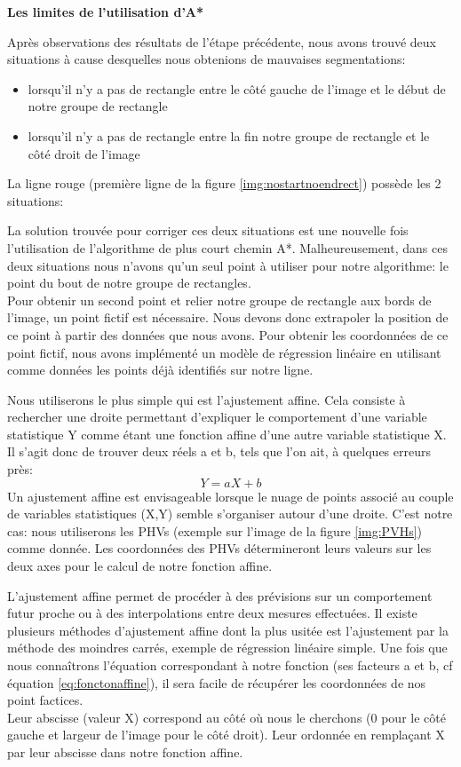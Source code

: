 \documentclass[12pt,a4paper]{article}
\begin{document}
\newpage
\bigbreak\textbf{Les limites de l'utilisation d'A*}\bigbreak

Après observations des résultats de l'étape précédente, nous avons trouvé deux situations à cause desquelles nous obtenions de mauvaises segmentations:
\begin{itemize}
    \item lorsqu'il n'y a pas de rectangle entre le côté gauche de l'image et le début de notre groupe de rectangle
    \item lorsqu'il n'y a pas de rectangle entre la fin notre groupe de rectangle et le côté droit de l'image
\end{itemize}
\bigbreak
La ligne rouge (première ligne de la figure \ref{img:nostartnoendrect}) possède les 2 situations:


\newpage
La solution trouvée pour corriger ces deux situations est une nouvelle fois l'utilisation de l'algorithme de plus court chemin A*.\bigbreak
Malheureusement, dans ces deux situations nous n'avons qu'un seul point à utiliser pour notre algorithme: le point du bout de notre groupe de rectangles.\\
Pour obtenir un second point et relier notre groupe de rectangle aux bords de l'image, un point fictif est nécessaire. Nous devons donc extrapoler la position de ce point à partir des données que nous avons. Pour obtenir les coordonnées de ce point fictif, nous avons implémenté un modèle de régression linéaire en utilisant comme données les points déjà identifiés sur notre ligne.\bigbreak


Nous utiliserons le plus simple qui est l'ajustement affine. Cela consiste à rechercher une droite permettant d'expliquer le comportement d'une variable statistique Y comme étant une fonction affine d'une autre variable statistique X. Il s'agit donc de trouver deux réels a et b, tels que l'on ait, à quelques erreurs près:
\begin{equation}
Y = aX + b
\label{eq:fonctonaffine}
\end{equation}
\bigbreak
Un ajustement affine est envisageable lorsque le nuage de points associé au couple de variables statistiques (X,Y) semble s'organiser autour d'une droite. C'est notre cas: nous utiliserons les PHVs (exemple sur l'image de la figure \ref{img:PVHs}) comme donnée. Les coordonnées des PHVs détermineront leurs valeurs sur les deux axes pour le calcul de notre fonction affine.\bigbreak 

L'ajustement affine permet de procéder à des prévisions sur un comportement futur proche ou à des interpolations entre deux mesures effectuées. Il existe plusieurs méthodes d'ajustement affine dont la plus usitée est l'ajustement par la méthode des moindres carrés, exemple de régression linéaire simple.\bigbreak
Une fois que nous connaîtrons l'équation correspondant à notre fonction (ses facteurs a et b, cf équation \ref{eq:fonctonaffine}), il sera facile de récupérer les coordonnées de nos point factices.\\
Leur abscisse (valeur X) correspond au côté où nous le cherchons (0 pour le côté gauche et \og largeur de l'image\fg{} pour le côté droit). Leur ordonnée en remplaçant X par leur abscisse dans notre fonction affine.
\end{document}
